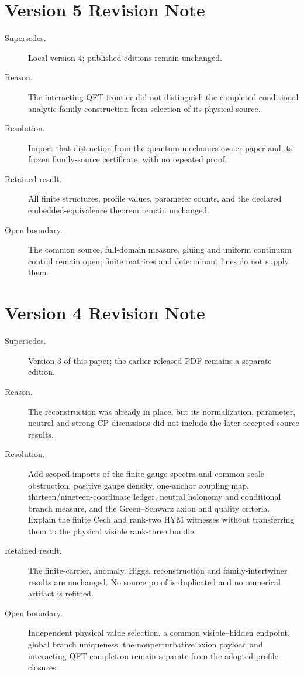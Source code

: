 \documentclass[11pt]{article}
\begin{document}
\section*{Version 5 Revision Note}
\begin{description}
\item[Supersedes.] Local version 4; published editions remain unchanged.
\item[Reason.] The interacting-QFT frontier did not distinguish the completed
conditional analytic-family construction from selection of its physical source.
\item[Resolution.] Import that distinction from the quantum-mechanics owner paper
and its frozen family-source certificate, with no repeated proof.
\item[Retained result.] All finite structures, profile values, parameter counts,
and the declared embedded-equivalence theorem remain unchanged.
\item[Open boundary.] The common source, full-domain measure, gluing and uniform
continuum control remain open; finite matrices and determinant lines do not supply them.
\end{description}

\section*{Version 4 Revision Note}
\begin{description}
\item[Supersedes.] Version 3 of this paper; the earlier released PDF remains a separate edition.
\item[Reason.] The reconstruction was already in place, but its normalization, parameter,
neutral and strong-CP discussions did not include the later accepted source results.
\item[Resolution.] Add scoped imports of the finite gauge spectra and common-scale obstruction,
positive gauge density, one-anchor coupling map, thirteen/nineteen-coordinate ledger,
neutral holonomy and conditional branch measure, and the Green--Schwarz axion and quality
criteria.  Explain the finite Cech and rank-two HYM witnesses without transferring them to
the physical visible rank-three bundle.
\item[Retained result.] The finite-carrier, anomaly, Higgs, reconstruction and family-intertwiner
results are unchanged.  No source proof is duplicated and no numerical artifact is refitted.
\item[Open boundary.] Independent physical value selection, a common visible--hidden endpoint,
global branch uniqueness, the nonperturbative axion payload and interacting QFT completion
remain separate from the adopted profile closures.
\end{description}
\end{document}

